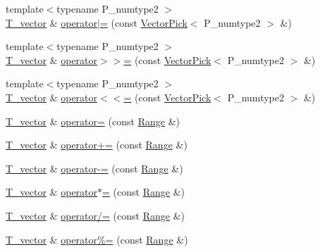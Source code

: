 \begin{DoxyCompactItemize}
{\footnotesize template$<$typename P\+\_\+numtype2 $>$ }\\\hyperlink{classTinyVector_aea08e4463006acf6842a93c026b27094}{T\+\_\+vector} \& \hyperlink{classTinyVector_a0f03723d4253bc4df25c29297fa62bd1}{operator$\vert$=} (const \hyperlink{classVectorPick}{Vector\+Pick}$<$ P\+\_\+numtype2 $>$ \&)
\item 
{\footnotesize template$<$typename P\+\_\+numtype2 $>$ }\\\hyperlink{classTinyVector_aea08e4463006acf6842a93c026b27094}{T\+\_\+vector} \& \hyperlink{classTinyVector_aebedf5ba0bb0098ce100e07ecea7452f}{operator$>$$>$=} (const \hyperlink{classVectorPick}{Vector\+Pick}$<$ P\+\_\+numtype2 $>$ \&)
\item 
{\footnotesize template$<$typename P\+\_\+numtype2 $>$ }\\\hyperlink{classTinyVector_aea08e4463006acf6842a93c026b27094}{T\+\_\+vector} \& \hyperlink{classTinyVector_ae2f31ef797d65f64f368baf11196d2ad}{operator$<$$<$=} (const \hyperlink{classVectorPick}{Vector\+Pick}$<$ P\+\_\+numtype2 $>$ \&)
\item 
\hyperlink{classTinyVector_aea08e4463006acf6842a93c026b27094}{T\+\_\+vector} \& \hyperlink{classTinyVector_ad1fe1d3d53e551a9d35cd304659dd391}{operator=} (const \hyperlink{classRange}{Range} \&)
\item 
\hyperlink{classTinyVector_aea08e4463006acf6842a93c026b27094}{T\+\_\+vector} \& \hyperlink{classTinyVector_a63816608e94ad62c46883f4cd2cef121}{operator+=} (const \hyperlink{classRange}{Range} \&)
\item 
\hyperlink{classTinyVector_aea08e4463006acf6842a93c026b27094}{T\+\_\+vector} \& \hyperlink{classTinyVector_ac618948e178ae04eed10bd34deec0b24}{operator-\/=} (const \hyperlink{classRange}{Range} \&)
\item 
\hyperlink{classTinyVector_aea08e4463006acf6842a93c026b27094}{T\+\_\+vector} \& \hyperlink{classTinyVector_ac0262babdc4159289bb6d82e3c45f44c}{operator$\ast$=} (const \hyperlink{classRange}{Range} \&)
\item 
\hyperlink{classTinyVector_aea08e4463006acf6842a93c026b27094}{T\+\_\+vector} \& \hyperlink{classTinyVector_ac84f7df213fb5d078b464f4ff7e058d4}{operator/=} (const \hyperlink{classRange}{Range} \&)
\item 
\hyperlink{classTinyVector_aea08e4463006acf6842a93c026b27094}{T\+\_\+vector} \& \hyperlink{classTinyVector_aa0be932a158980cb7b18a935a7e4f837}{operator\%=} (const \hyperlink{classRange}{Range} \&)
\item 

\end{DoxyCompactItemize}
